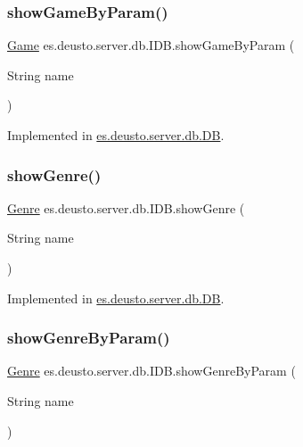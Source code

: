 \subsubsection{\texorpdfstring{show\+Game\+By\+Param()}{showGameByParam()}}
{\footnotesize\ttfamily \hyperlink{classes_1_1deusto_1_1server_1_1db_1_1data_1_1_game}{Game} es.\+deusto.\+server.\+db.\+I\+D\+B.\+show\+Game\+By\+Param (\begin{DoxyParamCaption}\item[{String}]{name }\end{DoxyParamCaption})}



Implemented in \hyperlink{classes_1_1deusto_1_1server_1_1db_1_1_d_b_a4fc9590d7e5643184ef89c3f03468e7e}{es.\+deusto.\+server.\+db.\+DB}.

\mbox{\label{interfacees_1_1deusto_1_1server_1_1db_1_1_i_d_b_a9023bdad77781d95fc2e556d1935f763}} 
\subsubsection{\texorpdfstring{show\+Genre()}{showGenre()}}
{\footnotesize\ttfamily \hyperlink{classes_1_1deusto_1_1server_1_1db_1_1data_1_1_genre}{Genre} es.\+deusto.\+server.\+db.\+I\+D\+B.\+show\+Genre (\begin{DoxyParamCaption}\item[{String}]{name }\end{DoxyParamCaption})}



Implemented in \hyperlink{classes_1_1deusto_1_1server_1_1db_1_1_d_b_a207ddeb183db925dc20f095033aa4d94}{es.\+deusto.\+server.\+db.\+DB}.

\mbox{\label{interfacees_1_1deusto_1_1server_1_1db_1_1_i_d_b_a836faee771a447be79c36d7d4289c614}} 
\subsubsection{\texorpdfstring{show\+Genre\+By\+Param()}{showGenreByParam()}}
{\footnotesize\ttfamily \hyperlink{classes_1_1deusto_1_1server_1_1db_1_1data_1_1_genre}{Genre} es.\+deusto.\+server.\+db.\+I\+D\+B.\+show\+Genre\+By\+Param (\begin{DoxyParamCaption}\item[{String}]{name }\end{DoxyParamCaption})}



